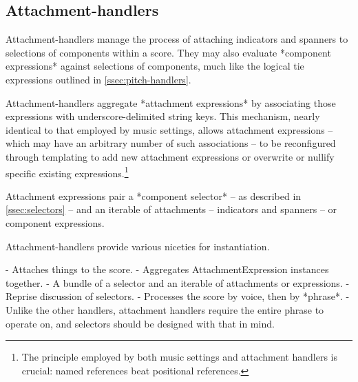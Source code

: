 \subsection{Attachment-handlers}
\label{ssec:attachment-handlers}

Attachment-handlers manage the process of attaching indicators and spanners to
selections of components within a score. They may also evaluate *component
expressions* against selections of components, much like the logical tie
expressions outlined in \autoref{ssec:pitch-handlers}.

Attachment-handlers aggregate *attachment expressions* by associating those
expressions with underscore-delimited string keys. This mechanism, nearly
identical to that employed by music settings, allows attachment expressions --
which may have an arbitrary number of such associations -- to be reconfigured
through templating to add new attachment expressions or overwrite or nullify
specific existing expressions.\footnote{The principle employed by both music
settings and attachment handlers is crucial: named references beat positional
references.}

Attachment expressions pair a *component selector* -- as described in
\autoref{ssec:selectors} -- and an iterable of attachments -- indicators and
spanners -- or component expressions.

Attachment-handlers provide various niceties for instantiation.

\begin{markdown}
-   Attaches things to the score.
-   Aggregates AttachmentExpression instances together.
    -   A bundle of a selector and an iterable of attachments or
        expressions.
    -   Reprise discussion of selectors.
-   Processes the score by voice, then by *phrase*.
    -   Unlike the other handlers, attachment handlers require the entire
        phrase to operate on, and selectors should be designed with that in
        mind.
\end{markdown}

\begin{comment}
<abjad>[stylesheet=../consort.ily]
music_specifier = consort.MusicSpecifier(
    attachment_handler=consort.AttachmentHandler(),
    rhythm_maker=rhythmmakertools.TaleaRhythmMaker(
        extra_counts_per_division=(0, 1),
        talea=rhythmmakertools.Talea([1, 2, 3, 1, 4], 16),
        ),
    )
timespan_maker = consort.TaleaTimespanMaker(
    initial_silence_talea=rhythmmakertools.Talea([0, 1], 4),
    playing_groupings=(1, 2, 2),
    playing_talea=rhythmmakertools.Talea([2, 3], 8),
    silence_talea=rhythmmakertools.Talea([1, 2, 3, 4], 8),
    )
music_setting = consort.MusicSetting(
    timespan_maker=timespan_maker,
    v1=music_specifier,
    v2=music_specifier,
    )
segment_maker = consort.SegmentMaker(
    desired_duration_in_seconds=8,
    discard_final_silence=True,
    permitted_time_signatures=[(2, 4), (5, 16), (3, 4)],
    score_template=templatetools.GroupedRhythmicStavesScoreTemplate(
        staff_count=2,
        with_clefs=True,
        ),
    settings=[music_setting],
    tempo=indicatortools.Tempo((1, 4), 72),
    )
show(segment_maker, verbose=False)
</abjad>
\end{comment}

